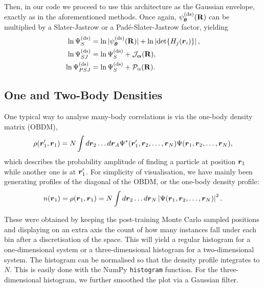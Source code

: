Then, in our code we proceed to use this architecture as the Gaussian envelope, exactly as in the aforementioned methods. Once again, $\psi_{\boldsymbol{\theta}}^{(\text{ds})}(\mathbf{R})$ can be multiplied by a Slater-Jastrow or a Padé-Slater-Jastrow factor, yielding
\begin{align*}
    \ln \Psi^{(\text{ds})}_{S} &= \ln|\psi^{(\text{ds})}_{\boldsymbol{\theta}}(\mathbf{R})| + \ln\left|\det\{H_{j}(\boldsymbol{r}_i)\}\right|, \\ 
    \ln \Psi^{(\text{ds})}_{SJ} &= \ln \Psi^{(\text{ds})}_{S} + \mathcal{J}_{\boldsymbol{\alpha}}(\mathbf{R}) ,\\ 
    \ln \Psi^{(\text{ds})}_{PSJ} &= \ln \Psi^{(\text{ds})}_{S} + \mathcal{P}_{\alpha}(\mathbf{R}). 
\end{align*}

\subsection{One and Two-Body Densities}

One typical way to analyse many-body correlations is via the one-body density matrix (OBDM),
\begin{align*}
    \rho(\boldsymbol{r}'_1,\boldsymbol{r}_1) = N \int d\boldsymbol{r}_2 \ldots d\boldsymbol{r}_A \Psi^*(\boldsymbol{r}'_1, \boldsymbol{r}_2, \ldots, \boldsymbol{r}_N) \Psi(\boldsymbol{r}_1, \boldsymbol{r}_2, \ldots, \boldsymbol{r}_N),
\end{align*}
which describes the probability amplitude of finding a particle at position $\boldsymbol{r}_1$ while another one is at $\boldsymbol{r}_1'$. For simplicity of visualisation, we have mainly been generating profiles of the diagonal of the OBDM, or the one-body density profile:
\begin{align*}
    n(\boldsymbol{r}_1) = \rho(\boldsymbol{r}_1, \boldsymbol{r}_1) = N \int d\boldsymbol{r}_2 \ldots d\boldsymbol{r}_N \left|\Psi(\boldsymbol{r}_1, \boldsymbol{r}_2, \ldots, \boldsymbol{r}_N)\right|^2 .
\end{align*}

These were obtained by keeping the post-training Monte Carlo sampled positions and displaying on an extra axis the count of how many instances fall under each bin after a discretisation of the space. This will yield a regular histogram for a one-dimensional system or a three-dimensional histogram for a two-dimensional system. The histogram can be normalised so that the density profile integrates to $N$. This is easily done with the NumPy \verb|histogram| function. For the three-dimensional histogram, we further smoothed the plot via a Gaussian filter.

